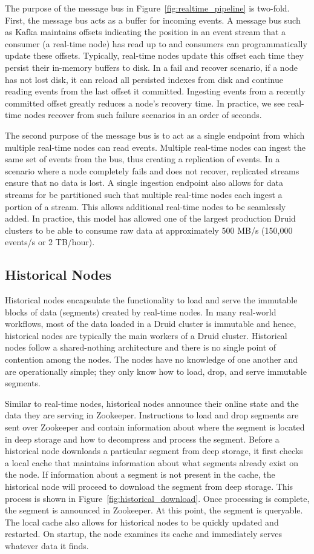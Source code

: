 \documentclass{acm_proc_article-sp}
\begin{document}
The purpose of the message bus in Figure~\ref{fig:realtime_pipeline} is
two-fold.  First, the message bus acts as a buffer for incoming events. A
message bus such as Kafka maintains offsets indicating the position in an event
stream that a consumer (a real-time node) has read up to and consumers can
programmatically update these offsets. Typically, real-time nodes update this
offset each time they persist their in-memory buffers to disk. In a fail and
recover scenario, if a node has not lost disk, it can reload all persisted
indexes from disk and continue reading events from the last offset it
committed. Ingesting events from a recently committed offset greatly reduces a
node's recovery time. In practice, we see real-time nodes recover from such
failure scenarios in an order of seconds.

The second purpose of the message bus is to act as a single endpoint from which
multiple real-time nodes can read events. Multiple real-time nodes can ingest
the same set of events from the bus, thus creating a replication of events. In
a scenario where a node completely fails and does not recover, replicated
streams ensure that no data is lost. A single ingestion endpoint also allows
for data streams for be partitioned such that multiple real-time nodes each
ingest a portion of a stream. This allows additional real-time nodes to be
seamlessly added. In practice, this model has allowed one of the largest
production Druid clusters to be able to consume raw data at approximately 500
MB/s (150,000 events/s or 2 TB/hour).

\subsection{Historical Nodes}
Historical nodes encapsulate the functionality to load and serve the immutable
blocks of data (segments) created by real-time nodes. In many real-world
workflows, most of the data loaded in a Druid cluster is immutable and hence,
historical nodes are typically the main workers of a Druid cluster.  Historical
nodes follow a shared-nothing architecture and there is no single point of
contention among the nodes. The nodes have no knowledge of one another and are
operationally simple; they only know how to load, drop, and serve immutable
segments. 

Similar to real-time nodes, historical nodes announce their online state and
the data they are serving in Zookeeper. Instructions to load and drop segments
are sent over Zookeeper and contain information about where the segment is
located in deep storage and how to decompress and process the segment.  Before
a historical node downloads a particular segment from deep storage, it first
checks a local cache that maintains information about what segments already
exist on the node.  If information about a segment is not present in the cache,
the historical node will proceed to download the segment from deep storage.
This process is shown in Figure~\ref{fig:historical_download}. Once processing
is complete, the segment is announced in Zookeeper.  At this point, the segment
is queryable. The local cache also allows for historical nodes to be quickly
updated and restarted. On startup, the node examines its cache and immediately
serves whatever data it finds.
\end{document}
